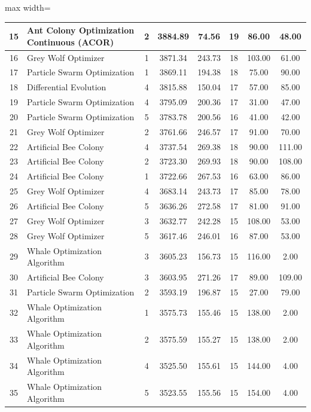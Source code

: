 \documentclass[Afour,sagev,times]{sagej}
\begin{document}
\begin{table}[htbp]
\begin{adjustbox}{max width=\textwidth}
\begin{tabular}{|c|l|c|c|c|c|c|c|}
15 & Ant Colony Optimization Continuous (ACOR) & 2 & 3884.89 & 74.56 & 19 & 86.00 & 48.00 \\ \hline
16 & Grey Wolf Optimizer & 1 & 3871.34 & 243.73 & 18 & 103.00 & 61.00 \\ \hline
17 & Particle Swarm Optimization & 1 & 3869.11 & 194.38 & 18 & 75.00 & 90.00 \\ \hline
18 & Differential Evolution & 4 & 3815.88 & 150.04 & 17 & 57.00 & 85.00 \\ \hline
19 & Particle Swarm Optimization & 4 & 3795.09 & 200.36 & 17 & 31.00 & 47.00 \\ \hline
20 & Particle Swarm Optimization & 5 & 3783.78 & 200.56 & 16 & 41.00 & 42.00 \\ \hline
21 & Grey Wolf Optimizer & 2 & 3761.66 & 246.57 & 17 & 91.00 & 70.00 \\ \hline
22 & Artificial Bee Colony & 4 & 3737.54 & 269.38 & 18 & 90.00 & 111.00 \\ \hline
23 & Artificial Bee Colony & 2 & 3723.30 & 269.93 & 18 & 90.00 & 108.00 \\ \hline
24 & Artificial Bee Colony & 1 & 3722.66 & 267.53 & 16 & 63.00 & 86.00 \\ \hline
25 & Grey Wolf Optimizer & 4 & 3683.14 & 243.73 & 17 & 85.00 & 78.00 \\ \hline
26 & Artificial Bee Colony & 5 & 3636.26 & 272.58 & 17 & 81.00 & 91.00 \\ \hline
27 & Grey Wolf Optimizer & 3 & 3632.77 & 242.28 & 15 & 108.00 & 53.00 \\ \hline
28 & Grey Wolf Optimizer & 5 & 3617.46 & 246.01 & 16 & 87.00 & 53.00 \\ \hline
29 & Whale Optimization Algorithm & 3 & 3605.23 & 156.73 & 15 & 116.00 & 2.00 \\ \hline
30 & Artificial Bee Colony & 3 & 3603.95 & 271.26 & 17 & 89.00 & 109.00 \\ \hline
31 & Particle Swarm Optimization & 2 & 3593.19 & 196.87 & 15 & 27.00 & 79.00 \\ \hline
32 & Whale Optimization Algorithm & 1 & 3575.73 & 155.46 & 15 & 138.00 & 2.00 \\ \hline
33 & Whale Optimization Algorithm & 2 & 3575.59 & 155.27 & 15 & 138.00 & 2.00 \\ \hline
34 & Whale Optimization Algorithm & 4 & 3525.50 & 155.61 & 15 & 144.00 & 4.00 \\ \hline
35 & Whale Optimization Algorithm & 5 & 3523.55 & 155.56 & 15 & 154.00 & 4.00 \\ \hline

\end{tabular}
\end{adjustbox}
\end{table}
\end{document}
